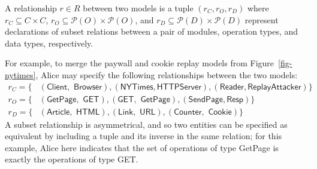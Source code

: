 \begin{defn} A relationship $r \in R$ between two models is a tuple
  $(r_{C}, r_{O}, r_{D})$ where $r_{C} \subseteq C \times C$, $r_{O}
  \subseteq \mathcal P (O) \times \mathcal P (O)$, and $r_{D}
  \subseteq \mathcal P (D) \times \mathcal P (D)$ represent
  declarations of subset relations between a pair of modules,
  operation types, and data types, respectively.
\end{defn}
For example, to merge the paywall and cookie replay models from
Figure~\ref{fig-nytimes}, Alice may specify the following
relationships between the two models:
\begin{align*}
  r_{C} = \{&(\textsf{Client$,$ Browser}),(\textsf{NYTimes$,$
    HTTPServer}), (\textsf{Reader$,$
    ReplayAttacker})\} \\
  r_{O} = \{&(\textsf{GetPage$,$ GET}), (\textsf{GET$,$ GetPage}),
  (\textsf{SendPage$,$
    Resp})\}\\
  r_{D} = \{&(\textsf{Article$,$ HTML}),(\textsf{Link$,$ URL}),
  (\textsf{Counter$,$ Cookie})\}
\end{align*}
A subset relationship is asymmetrical, and so two entities can be
specified as equivalent by including a tuple and its inverse in the
same relation; for this example, Alice here indicates that the set of
operations of type \textsf{GetPage} is exactly the operations of type
\textsf{GET}.


